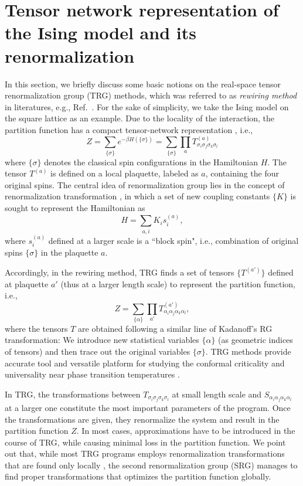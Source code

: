 \documentclass[aps,prx,twocolumn,showpacs,psfig,superscriptaddress,longbibliography]{revtex4-1}
\def\beq{\begin{equation}}
\def\eeq{\end{equation}}
\begin{document}
\section{Tensor network representation of the Ising model and its renormalization}
\label{App:TNIsing}
In this section, we briefly discuss some basic notions on the real-space tensor renormalization group (TRG) methods, which was referred to as \textit{rewiring method} in literatures, e.g., Ref.~\cite{Kadanoff-RMP2014}. For the sake of simplicity, we take the Ising model on the square lattice as an example. Due to the locality of the interaction, the partition function has a compact tensor-network representation \cite{SRG-PRB2010}, i.e.,
\beq
Z = \sum_{\{\sigma\}}e^{-\beta H(\{\sigma\})} = \sum_{\{\sigma\}}\prod_{a} T_{\sigma_i\sigma_j\sigma_k\sigma_l}^{(a)}
\eeq
where $\{\sigma\}$ denotes the classical spin configurations in the Hamiltonian $H$. The tensor $T^{(a)}$ is defined on a local plaquette, labeled as $a$, containing the four original spins. The central idea of renormalization group lies in the concept of renormalization transformation \cite{Wilson-RMP1975, Kadanoff-PRL1975}, in which a set of new coupling constants $\{K\}$ is sought to represent the Hamiltonian as 
\beq
H = \sum_{a,i}K_is^{(a)}_i,  \label{RGtrans}
\eeq
where $s^{(a)}_i$ defined at a larger scale is a ``block spin", i.e., combination of original spins $\{\sigma\}$ in the plaquette $a$. 

Accordingly, in the rewiring method, TRG finds a set of tensors $\{T^{(a')}\}$ defined at plaquette $a'$ (thus at a larger length scale) to represent the partition function, i.e., 
$$Z = \sum_{\{\alpha\}}\prod_{a'} T_{\alpha_i\alpha_j\alpha_k\alpha_l}^{(a')},$$ 
where the tensors $T$ are obtained following a similar line of Kadanoff's RG transformation: We introduce new statistical variables $\{\alpha\}$ (as geometric indices of tensors) and then trace out the original variables $\{\sigma\}$. TRG methods provide accurate tool and versatile platform for studying the conformal criticality and universality near phase transition temperatures \cite{Kadanoff-RMP2014}.

In TRG, the transformations between $T_{\sigma_i\sigma_j\sigma_k\sigma_l}$ at small length scale and $S_{\alpha_i\alpha_j\alpha_k\alpha_l}$ at a larger one constitute the most important parameters of the program. Once the transformations are given, they renormalize the system and result in the partition function $Z$. In most cases, approximations have to be introduced in the course of TRG, while causing minimal loss in the partition function. We point out that, while most TRG programs employs renormalization transformations that are found only locally \cite{Levin.m+:2007:TRG, TEFR-PRB2009, TNR-PRL2015, LoopTRG-PRL2017, PosTRG-PRL2017}, the second renormalization group (SRG) \cite{Xie2009, SRG-PRB2010, Xie2012, HOSRG-PRB2016} manages to find proper transformations that optimizes the partition function globally. 
\end{document}
